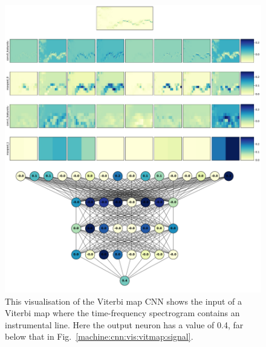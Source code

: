 \begin{figure}[h]
	\centering
	\includegraphics[width=\textwidth]{C4_cnn/vitmap_cnn_visualisation_line.pdf}
	\caption[Network visualisation for instrumental line.]{This visualisation of the Viterbi map \gls{CNN} shows the input of a Viterbi map where the time-frequency spectrogram contains an instrumental line. Here the output neuron has a value of 0.4, far below that in Fig.~\ref{machine:cnn:vis:vitmap:signal}.}
	\label{machine:cnn:vis:vitmap:line}
\end{figure}

